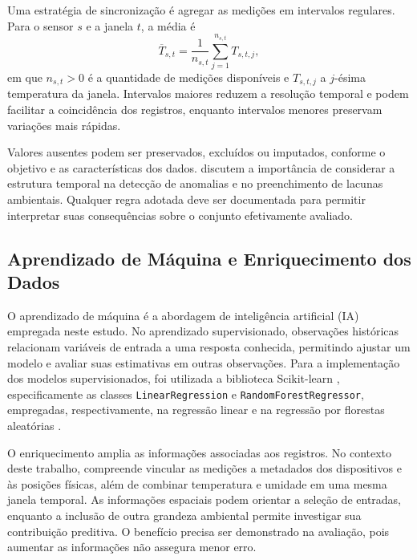 Uma estratégia de sincronização é agregar as medições em intervalos
regulares. Para o sensor $s$ e a janela $t$, a média é
\begin{equation}
    \overline{T}_{s,t}=\frac{1}{n_{s,t}}
    \sum_{j=1}^{n_{s,t}}T_{s,t,j},
    \label{eq:media_temporal}
\end{equation}
em que $n_{s,t}>0$ é a quantidade de medições disponíveis e $T_{s,t,j}$
a $j$-ésima temperatura da janela. Intervalos maiores reduzem a resolução
temporal e podem facilitar a coincidência dos registros, enquanto
intervalos menores preservam variações mais rápidas.

Valores ausentes podem ser preservados, excluídos ou imputados, conforme
o objetivo e as características dos dados. 
discutem a importância de considerar a estrutura temporal na detecção
de anomalias e no preenchimento de lacunas ambientais. Qualquer regra
adotada deve ser documentada para permitir interpretar suas consequências
sobre o conjunto efetivamente avaliado.

\subsection{Aprendizado de Máquina e Enriquecimento dos Dados}
\label{subsec:ia_enriquecimento}

O aprendizado de máquina é a abordagem de inteligência artificial (IA)
empregada neste estudo. No aprendizado supervisionado, observações
históricas relacionam variáveis de entrada a uma resposta conhecida,
permitindo ajustar um modelo e avaliar suas estimativas em outras
observações. Para a implementação dos modelos supervisionados, foi utilizada a biblioteca Scikit-learn \cite{pedregosa2011scikit}, especificamente as classes \texttt{LinearRegression} e \texttt{RandomForestRegressor}, empregadas, respectivamente, na regressão linear e na regressão por florestas aleatórias \cite{breiman2001random}.

O enriquecimento amplia as informações associadas aos registros.
No contexto deste trabalho, compreende vincular as medições a metadados
dos dispositivos e às posições físicas, além de combinar temperatura
e umidade em uma mesma janela temporal. As informações espaciais podem
orientar a seleção de entradas, enquanto a inclusão de outra grandeza
ambiental permite investigar sua contribuição preditiva. O benefício
precisa ser demonstrado na avaliação, pois aumentar as informações
não assegura menor erro.

